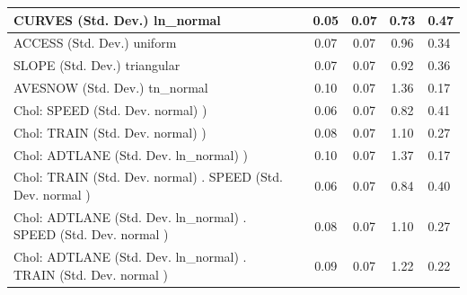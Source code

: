 \begin{table}
\begin{center}
\begin{tabular}{|l|l|c|c|c|l|}
			\hline
			CURVES (Std. Dev.) ln_normal &  & 0.05 & 0.07 & 0.73 & 0.47 \\
			\hline
			ACCESS (Std. Dev.) uniform &  & 0.07 & 0.07 & 0.96 & 0.34 \\
			\hline
			SLOPE (Std. Dev.) triangular &  & 0.07 & 0.07 & 0.92 & 0.36 \\
			\hline
			AVESNOW (Std. Dev.) tn_normal &  & 0.10 & 0.07 & 1.36 & 0.17 \\
			\hline
			 Chol: SPEED (Std. Dev. normal) ) &  & 0.06 & 0.07 & 0.82 & 0.41 \\
			\hline
			 Chol: TRAIN (Std. Dev. normal) ) &  & 0.08 & 0.07 & 1.10 & 0.27 \\
			\hline
			 Chol: ADTLANE (Std. Dev. ln_normal) ) &  & 0.10 & 0.07 & 1.37 & 0.17 \\
			\hline
			 Chol: TRAIN (Std. Dev. normal) . SPEED (Std. Dev.   normal ) &  & 0.06 & 0.07 & 0.84 & 0.40 \\
			\hline
			 Chol: ADTLANE (Std. Dev. ln_normal) . SPEED (Std. Dev.   normal ) &  & 0.08 & 0.07 & 1.10 & 0.27 \\
			\hline
			 Chol: ADTLANE (Std. Dev. ln_normal) . TRAIN (Std. Dev.   normal ) &  & 0.09 & 0.07 & 1.22 & 0.22 \\
			\hline
		\end{tabular}
	\end{center}
\end{table}